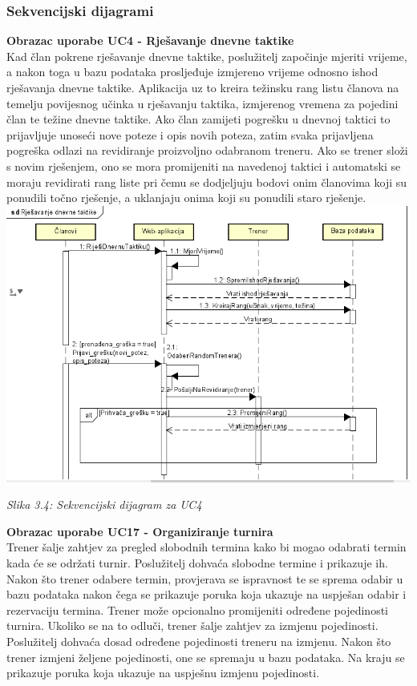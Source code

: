 \documentclass{article}
\begin{document}
		\subsubsection{Sekvencijski dijagrami}
		\textbf{Obrazac uporabe UC4 - Rješavanje dnevne taktike}\\
		Kad član pokrene rješavanje dnevne taktike, poslužitelj započinje mjeriti vrijeme, a nakon toga u bazu podataka prosljeđuje izmjereno vrijeme odnosno ishod rješavanja dnevne taktike.
		Aplikacija uz to kreira težinsku rang listu članova na temelju povijesnog učinka u rješavanju taktika, izmjerenog vremena za pojedini član te težine dnevne taktike.
		Ako član zamijeti pogrešku u dnevnoj taktici to prijavljuje unoseći nove poteze i opis novih poteza, zatim svaka prijavljena pogreška odlazi na revidiranje proizvoljno odabranom treneru. Ako se trener složi s novim rješenjem, ono se mora promijeniti na navedenoj taktici i automatski se moraju revidirati rang liste pri čemu se dodjeljuju bodovi onim članovima koji su ponudili točno rješenje, a uklanjaju onima koji su ponudili staro rješenje.
		\eject
		\includegraphics[width=\columnwidth]{rjesavanje_dnevnih_taktika}
		\begin{center}
			\textit{Slika 3.4: Sekvencijski dijagram za UC4}
		\end{center}
		\eject
		\textbf{Obrazac uporabe UC17 - Organiziranje turnira}\\
		Trener šalje zahtjev za pregled slobodnih termina kako bi mogao odabrati termin kada će se održati turnir. Poslužitelj dohvaća slobodne termine i prikazuje ih. Nakon što trener odabere termin, provjerava se ispravnost te se sprema odabir u bazu podataka nakon čega se prikazuje poruka koja ukazuje na uspješan odabir i rezervaciju termina. Trener može opcionalno promijeniti određene pojedinosti turnira. Ukoliko se na to odluči, trener šalje zahtjev za izmjenu pojedinosti. Poslužitelj dohvaća dosad određene pojedinosti treneru na izmjenu. Nakon što trener izmjeni željene pojedinosti, one se spremaju u bazu podataka. Na kraju se prikazuje poruka koja ukazuje na uspješnu izmjenu pojedinosti.
\end{document}
